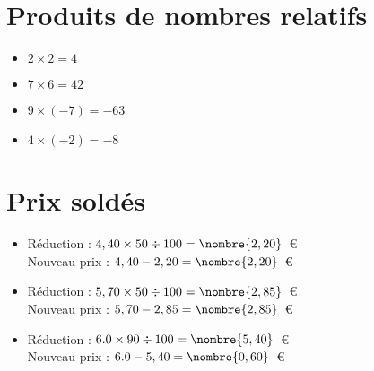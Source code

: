\documentclass[a4paper,11pt,fleqn]{article}
\begin{document}
\section{Produits de nombres relatifs}
\begin{itemize}

  \item $2\times2=4$
  \item $7\times6=42$
  \item $9\times(-7)=-63$
  \item $4\times(-2)=-8$
\end{itemize}

\section{Prix soldés}
\begin{itemize}

  \item Réduction : $4,40\times50\div100=\nombre{2,20}$~€\\
  Nouveau prix : $4,40-2,20=\nombre{2,20}$~€
  \item Réduction : $5,70\times50\div100=\nombre{2,85}$~€\\
  Nouveau prix : $5,70-2,85=\nombre{2,85}$~€
  \item Réduction : $6.0\times90\div100=\nombre{5,40}$~€\\
  Nouveau prix : $6.0-5,40=\nombre{0,60}$~€
\end{itemize}
\end{document}
